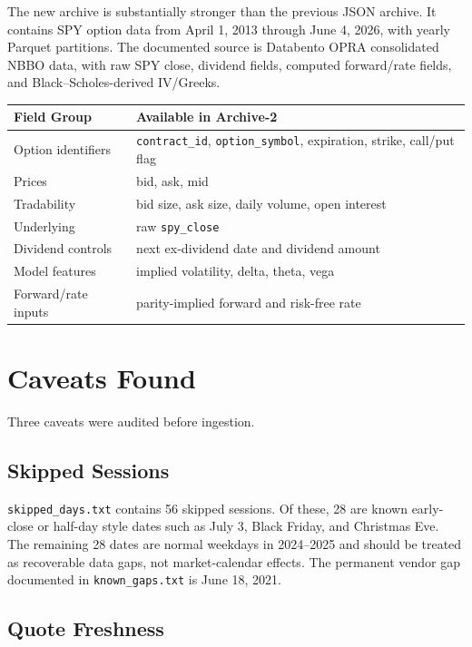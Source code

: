 \documentclass[11pt]{article}
\begin{document}
The new archive is substantially stronger than the previous JSON archive. It
contains SPY option data from April 1, 2013 through June 4, 2026, with yearly
Parquet partitions. The documented source is Databento OPRA consolidated NBBO
data, with raw SPY close, dividend fields, computed forward/rate fields, and
Black--Scholes-derived IV/Greeks.

\begin{longtable}{>{\raggedright\arraybackslash}p{}p{}}
\toprule
\textbf{Field Group} & \textbf{Available in Archive-2} \\
\midrule
Option identifiers & \texttt{contract\_id}, \texttt{option\_symbol}, expiration, strike, call/put flag \\
Prices & bid, ask, mid \\
Tradability & bid size, ask size, daily volume, open interest \\
Underlying & raw \texttt{spy\_close} \\
Dividend controls & next ex-dividend date and dividend amount \\
Model features & implied volatility, delta, theta, vega \\
Forward/rate inputs & parity-implied forward and risk-free rate \\
\bottomrule
\end{longtable}

\section*{Caveats Found}

Three caveats were audited before ingestion.

\subsection*{Skipped Sessions}

\texttt{skipped\_days.txt} contains 56 skipped sessions. Of these, 28 are
known early-close or half-day style dates such as July 3, Black Friday, and
Christmas Eve. The remaining 28 dates are normal weekdays in 2024--2025 and
should be treated as recoverable data gaps, not market-calendar effects. The
permanent vendor gap documented in \texttt{known\_gaps.txt} is June 18, 2021.

\subsection*{Quote Freshness}
\end{document}
